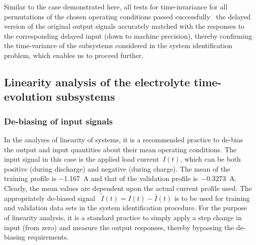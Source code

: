 Similar to  the case demonstrated  here, all  tests for time-invariance  for all
permutations of  the chosen operating  conditions passed successfully  \ie~the
delayed  version of  the original  output  signals accurately  matched with  the
responses  to  the corresponding  delayed  input  (down to  machine  precision),
thereby confirming the time-variance of  the subsystems considered in the system
identification problem, which enables us to proceed further.

\subsection{Linearity analysis of the electrolyte time-evolution subsystems}\label{subsec:linearityanalysis}

\subsubsection*{De-biasing of  input signals}

In the analyses of linearity of systems, it is a recommended practice to de-bias
the output and input quantities about their mean operating conditions. The input
signal  in this  case is  the  applied load  current~$I(t)$, which  can be  both
positive  (during discharge)  and  negative  (during charge).  The  mean of  the
training  profile is  \SI{-1.167}{\ampere} and  that of  the validation  profile
is~\SI{-0.3273}{\ampere}. Clearly, the mean values are dependent upon the actual
current profile used. The appropriately de-biased signal \ie~$\widetilde{I}(t) =
I(t) - \bar{I}(t)$  is to be used  for training and validation data  sets in the
system identification procedure. For the purpose  of linearity analysis, it is a
standard practice to simply apply a step change in input (from zero) and measure
the output responses, thereby bypassing the de-biasing requirements.

